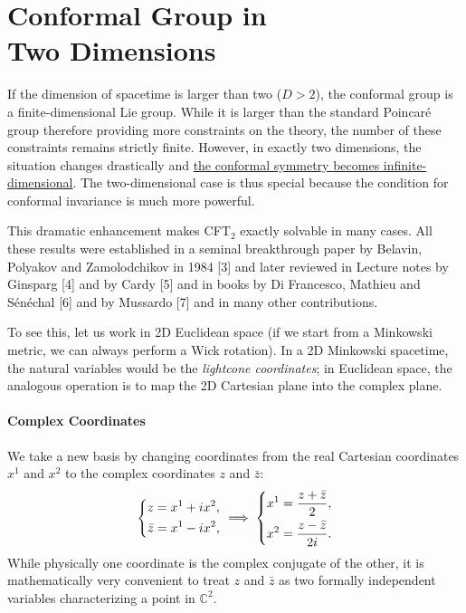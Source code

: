 \chapter[Conformal Group in Two Dimensions]{Conformal Group in \\Two Dimensions}

If the dimension of spacetime is larger than two (\(D>2\)), the conformal group is a finite-dimensional Lie group. While it is larger than the standard Poincar\'e group therefore providing more constraints on the theory, the number of these constraints remains strictly finite. However, in exactly two dimensions, the situation changes drastically and \uline{the conformal symmetry becomes infinite-dimensional}. The two-dimensional case is thus special because the condition for conformal invariance is much more powerful.

This dramatic enhancement makes CFT\(_2\) exactly solvable in many cases. All these results were established in a seminal breakthrough paper by Belavin, Polyakov and Zamolodchikov in 1984 [3] and later reviewed in Lecture notes by Ginsparg [4] and by Cardy [5] and in books by Di Francesco, Mathieu and Sénéchal [6] and by Mussardo [7] and in many other contributions. 

To see this, let us work in 2D Euclidean space (if we start from a Minkowski metric, we can always perform a Wick rotation). In a 2D Minkowski spacetime, the natural variables would be the \textit{lightcone coordinates}; in Euclidean space, the analogous operation is to map the 2D Cartesian plane into the complex plane.

\subsubsection{Complex Coordinates}

We take a new basis by changing coordinates from the real Cartesian coordinates \(x^1\) and \(x^2\) to the complex coordinates \(z\) and \(\bar{z}\):
\[
    \begin{dcases}
        z = x^1 + i x^2, \\
        \bar{z} = x^1 - i x^2,
    \end{dcases} \implies \begin{dcases}
        x^1 = \frac{z + \bar{z}}{2}, \\
        x^2 = \frac{z - \bar{z}}{2i}.
    \end{dcases}
\]
While physically one coordinate is the complex conjugate of the other, it is mathematically very convenient to treat \(z\) and \(\bar{z}\) as two formally independent variables characterizing a point in \(\mathbb{C}^2\).


